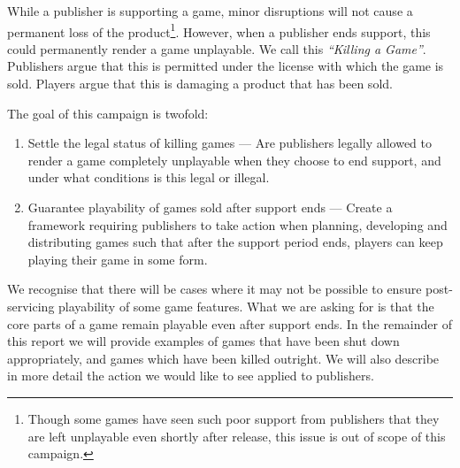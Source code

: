
While a publisher is supporting a game, minor disruptions will not cause a permanent loss of the product\footnote{
    Though some games have seen such poor support from publishers that they are left unplayable even shortly after release, this issue is out of scope of this campaign.
}.
However, when a publisher ends support, this could permanently render a game unplayable.
We call this \emph{``Killing a Game''}.
Publishers argue that this is permitted under the license with which the game is sold.
Players argue that this is damaging a product that has been sold.

The goal of this campaign is twofold:
\begin{enumerate}
    \item Settle the legal status of killing games ---
    Are publishers legally allowed to render a game completely unplayable when they choose to end support, and under what conditions is this legal or illegal.
    \item Guarantee playability of games sold after support ends ---
    Create a framework requiring publishers to take action when planning, developing and distributing games such that after the support period ends,
    players can keep playing their game in some form.
\end{enumerate}

We recognise that there will be cases where it may not be possible to ensure post-servicing playability of some game features.
What we are asking for is that the core parts of a game remain playable even after support ends.
In the remainder of this report we will provide examples of games that have been shut down appropriately, and games which have been killed outright.
We will also describe in more detail the action we would like to see applied to publishers.

